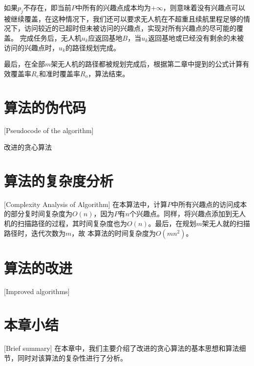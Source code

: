 如果$p_j$不存在，即当前$P$中所有的兴趣点成本均为$+\infty$，则意味着没有兴趣点可以被继续覆盖，在这种情况下，我们还可以要求无人机在不超重且续航里程足够的情况下，访问较近的已超时但未被访问的兴趣点，实现对所有兴趣点的尽可能的覆盖。
完成任务后，无人机$u_k$应返回基地$B$，当$u_k$返回基地或已经没有剩余的未被访问的兴趣点时，$u_k$的路径规划完成。


最后，在全部$m$架无人机的路径都被规划完成后，根据第二章中提到的公式计算有效覆盖率$R_e$和准时覆盖率$R_o$，算法结束。

\section{算法的伪代码}[Pseudocode of the algorithm]
\begin{algorithm}[H]
\caption{改进的贪心算法}
\LinesNumbered %
\end{algorithm}

\section{算法的复杂度分析}[Complexity Analysis of Algorithm]
在本算法中，计算$P$中所有兴趣点的访问成本的部分复时间复杂度为$O(n)$，因为$P$有$n$个兴趣点。同样，将兴趣点添加到无人机的扫描路径的过程，其时间复杂度也为$O(n)$。最后，在规划$m$架无人就的扫描路径时，迭代次数为$m$，故
本算法的时间复杂度为$O(mn^2)$。

\section{算法的改进}[Improved algorithms]

\section{本章小结}[Brief summary]
在本章中，我们主要介绍了改进的贪心算法的基本思想和算法细节，同时对该算法的复杂性进行了分析。
